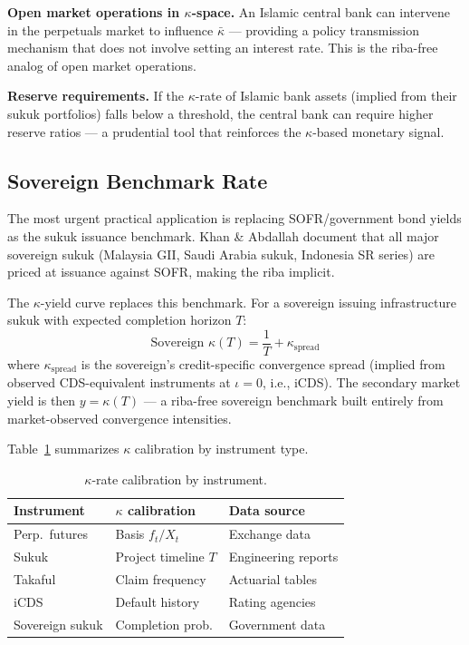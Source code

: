 \documentclass[10pt,twocolumn]{article}
\theoremstyle{plain}
\theoremstyle{definition}
\begin{document}
\textbf{Open market operations in $\kappa$-space.}
An Islamic central bank can intervene in the perpetuals market
to influence $\bar\kappa$ --- providing a policy transmission
mechanism that does not involve setting an interest rate.
This is the riba-free analog of open market operations.

\textbf{Reserve requirements.}
If the $\kappa$-rate of Islamic bank assets (implied from their
sukuk portfolios) falls below a threshold, the central bank
can require higher reserve ratios --- a prudential tool that
reinforces the $\kappa$-based monetary signal.

\subsection{Sovereign Benchmark Rate}
\label{sec:sovereign}

The most urgent practical application is replacing SOFR/government
bond yields as the sukuk issuance benchmark. Khan \& Abdallah
\cite{KhanAbdallah2017} document that all major sovereign sukuk
(Malaysia GII, Saudi Arabia sukuk, Indonesia SR series) are priced
at issuance against SOFR, making the riba implicit.

The $\kappa$-yield curve replaces this benchmark. For a sovereign
issuing infrastructure sukuk with expected completion horizon $T$:
\begin{equation}
\text{Sovereign } \kappa(T) = \frac{1}{T} + \kappa_{\text{spread}}
\label{eq:sovereign_kappa}
\end{equation}
where $\kappa_{\text{spread}}$ is the sovereign's credit-specific
convergence spread (implied from observed CDS-equivalent instruments
at $\iota = 0$, i.e., iCDS). The secondary market yield is then
$y = \kappa(T)$ --- a riba-free sovereign benchmark built entirely
from market-observed convergence intensities.

Table~\ref{tab:calibration} summarizes $\kappa$ calibration
by instrument type.

\begin{table}[h!]
\centering
\caption{$\kappa$-rate calibration by instrument.}
\label{tab:calibration}
\small
\begin{tabular}{@{}p{2.4cm}p{2.6cm}p{2.0cm}@{}}
\toprule
\textbf{Instrument} & \textbf{$\kappa$ calibration} & \textbf{Data source} \\
\midrule
Perp.\ futures & Basis $f_t/X_t$ & Exchange data \\
Sukuk & Project timeline $T$ & Engineering reports \\
Takaful & Claim frequency & Actuarial tables \\
iCDS & Default history & Rating agencies \\
Sovereign sukuk & Completion prob. & Government data \\
\bottomrule
\end{tabular}
\end{table}
\end{document}
